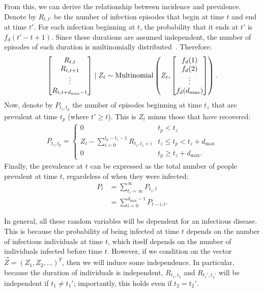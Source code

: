 \documentclass[thesis.tex]{subfiles}
\begin{document}
From this, we can derive the relationship between incidence and prevalence.
Denote by $R_{t,t'}$ be the number of infection episodes that begin at time $t$ and end at time $t'$.
For each infection beginning at $t$, the probability that it ends at $t'$ is $f_d(t' - t + 1)$.
Since these durations are assumed independent, the number of episodes of each duration is multinomially distributed~\autocite{paganoHIV}.
Therefore:
\begin{align}
\begin{bmatrix}
  R_{t,t} \\ R_{t,t+1} \\ \vdots \\ R_{t,t+d_\text{max}-1}
\end{bmatrix} \mid Z_t
\sim \operatorname{Multinomial} \left(
  Z_t, 
  \begin{bmatrix}
    f_d(1) \\ f_d(2) \\ \vdots \\ f_d(d_\text{max})
  \end{bmatrix}
\right).
\end{align}
Now, denote by $P_{t_z,t_p}$ the number of episodes beginning at time $t_z$ that are prevalent at time $t_p$ (where $t' \geq t$).
This is $Z_t$ minus those that have recovered:
\begin{align}
    P_{t_z,t_p} = \begin{cases}
      0 &t_p < t_z\\
      Z_t - \sum_{i=0}^{t_p-t_z-1} R_{t_z,t_z+i} &t_z \leq t_p < t_z + d_\text{max}\\
      0 &t_p \geq t_z + d_\text{max}.
  \end{cases} \label{incprev:eq:Ptt-to-R}
\end{align}
Finally, the prevalence at $t$ can be expressed as the total number of people prevalent at time $t$, regardeless of when they were infected:
\begin{align}
  P_t
  &= \sum_{t_z=\infty}^\infty P_{t_z,t} \\
  &= \sum_{i=0}^{d_\text{max}-1} P_{t-i,t} \label{incprev:eq:Pt-to-Ptt}.
\end{align}

In general, all these random variables will be dependent for an infectious disease.
This is because the probability of being infected at time $t$ depends on the number of infectious individuals at time $t$, which itself depends on the number of individuals infected before time $t$.
However, if we condition on the vector $\vec{Z} = (Z_1, Z_2, \dots)^T$, then we will induce some independence.
In particular, because the duration of individuals is independent, $R_{t_1,t_2}$ and $R_{t_1',t_2'}$ will be independent if $t_1 \neq t_1'$; importantly, this holds even if $t_2 = t_2'$.
\end{document}
